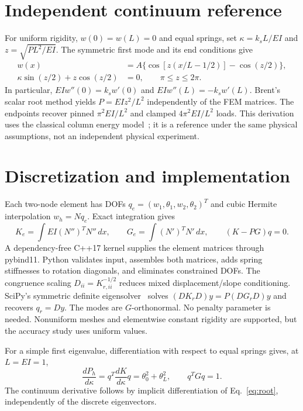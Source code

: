 \documentclass[10pt,a4paper]{article}
\begin{document}
\section{Independent continuum reference}
For uniform rigidity, $w(0)=w(L)=0$ and equal springs, set $\kappa=k_s L/EI$
and $z=\sqrt{PL^2/EI}$. The symmetric first mode and its end conditions give
\begin{align}
 w(x)&=A\{\cos[z(x/L-1/2)]-\cos(z/2)\},\\
 \kappa\sin(z/2)+z\cos(z/2)&=0,\qquad \pi\le z\le2\pi. \label{eq:root}
\end{align}
In particular, $EIw''(0)=k_s w'(0)$ and $EIw''(L)=-k_s w'(L)$.
Brent's scalar root method yields $P=EI z^2/L^2$ independently of the FEM
matrices. The endpoints recover pinned $\pi^2EI/L^2$ and clamped
$4\pi^2EI/L^2$ loads. This derivation uses the classical column energy
model~\cite{stability}; it is a reference under the same physical assumptions,
not an independent physical experiment.

\newpage
\section{Discretization and implementation}
Each two-node element has DOFs $q_e=(w_1,\theta_1,w_2,\theta_2)^T$ and
cubic Hermite interpolation $w_h=Nq_e$. Exact integration gives
\begin{equation}
 K_e=\int EI(N'')^TN''\,dx,\qquad G_e=\int(N')^TN'\,dx,
 \qquad (K-PG)q=0. \label{eq:discrete}
\end{equation}
A dependency-free C++17 kernel supplies the element matrices through
pybind11. Python validates input, assembles both matrices, adds spring
stiffnesses to rotation diagonals, and eliminates constrained DOFs. The
congruence scaling $D_{ii}=K_{r,ii}^{-1/2}$ reduces mixed displacement/slope
conditioning. SciPy's symmetric definite eigensolver~\cite{scipy} solves
$(DK_rD)y=P(DG_rD)y$ and recovers $q_r=Dy$. The modes are $G$-orthonormal.
No penalty parameter is needed. Nonuniform meshes and elementwise constant
rigidity are supported, but the accuracy study uses uniform values.

For a simple first eigenvalue, differentiation with respect to equal springs
gives, at $L=EI=1$,
\begin{equation}
 \frac{dP_h}{d\kappa}=q^T\frac{dK}{d\kappa}q
 =\theta_0^2+\theta_L^2,\qquad q^TGq=1. \label{eq:sensitivity}
\end{equation}
The continuum derivative follows by implicit differentiation of
Eq.~\eqref{eq:root}, independently of the discrete eigenvectors.
\end{document}
